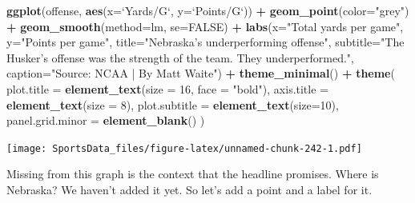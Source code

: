 \documentclass[]{book}
\newenvironment{Shaded}{\begin{snugshade}}{\end{snugshade}}
\newcommand{\KeywordTok}[1]{\textcolor[rgb]{0.13,0.29,0.53}{\textbf{#1}}}
\newcommand{\DataTypeTok}[1]{\textcolor[rgb]{0.13,0.29,0.53}{#1}}
\newcommand{\DecValTok}[1]{\textcolor[rgb]{0.00,0.00,0.81}{#1}}
\newcommand{\StringTok}[1]{\textcolor[rgb]{0.31,0.60,0.02}{#1}}
\newcommand{\OtherTok}[1]{\textcolor[rgb]{0.56,0.35,0.01}{#1}}
\newcommand{\OperatorTok}[1]{\textcolor[rgb]{0.81,0.36,0.00}{\textbf{#1}}}
\newcommand{\NormalTok}[1]{#1}
\begin{document}
\begin{Shaded}
\begin{Highlighting}[]
\KeywordTok{ggplot}\NormalTok{(offense, }\KeywordTok{aes}\NormalTok{(}\DataTypeTok{x=}\StringTok{`}\DataTypeTok{Yards/G}\StringTok{`}\NormalTok{, }\DataTypeTok{y=}\StringTok{`}\DataTypeTok{Points/G}\StringTok{`}\NormalTok{)) }\OperatorTok{+}\StringTok{ }
\StringTok{  }\KeywordTok{geom_point}\NormalTok{(}\DataTypeTok{color=}\StringTok{"grey"}\NormalTok{) }\OperatorTok{+}\StringTok{ }\KeywordTok{geom_smooth}\NormalTok{(}\DataTypeTok{method=}\NormalTok{lm, }\DataTypeTok{se=}\OtherTok{FALSE}\NormalTok{) }\OperatorTok{+}\StringTok{ }
\StringTok{  }\KeywordTok{labs}\NormalTok{(}\DataTypeTok{x=}\StringTok{"Total yards per game"}\NormalTok{, }\DataTypeTok{y=}\StringTok{"Points per game"}\NormalTok{, }\DataTypeTok{title=}\StringTok{"Nebraska's underperforming offense"}\NormalTok{, }\DataTypeTok{subtitle=}\StringTok{"The Husker's offense was the strength of the team. They underperformed."}\NormalTok{, }\DataTypeTok{caption=}\StringTok{"Source: NCAA | By Matt Waite"}\NormalTok{) }\OperatorTok{+}\StringTok{ }
\StringTok{  }\KeywordTok{theme_minimal}\NormalTok{() }\OperatorTok{+}\StringTok{ }
\StringTok{  }\KeywordTok{theme}\NormalTok{(}
    \DataTypeTok{plot.title =} \KeywordTok{element_text}\NormalTok{(}\DataTypeTok{size =} \DecValTok{16}\NormalTok{, }\DataTypeTok{face =} \StringTok{"bold"}\NormalTok{),}
    \DataTypeTok{axis.title =} \KeywordTok{element_text}\NormalTok{(}\DataTypeTok{size =} \DecValTok{8}\NormalTok{), }
    \DataTypeTok{plot.subtitle =} \KeywordTok{element_text}\NormalTok{(}\DataTypeTok{size=}\DecValTok{10}\NormalTok{), }
    \DataTypeTok{panel.grid.minor =} \KeywordTok{element_blank}\NormalTok{()}
\NormalTok{    ) }
\end{Highlighting}
\end{Shaded}

\texttt{[image: SportsData\_files/figure-latex/unnamed-chunk-242-1.pdf]}

Missing from this graph is the context that the headline promises. Where
is Nebraska? We haven't added it yet. So let's add a point and a label
for it.
\end{document}
